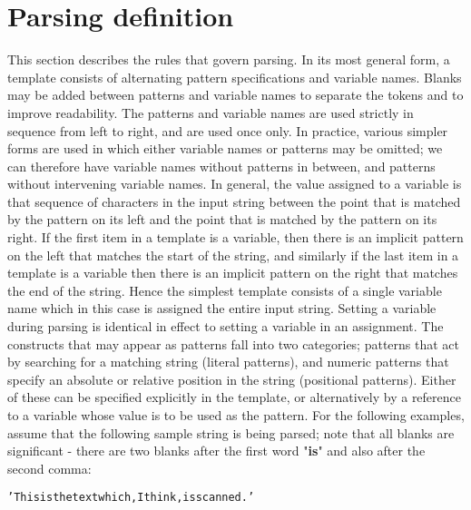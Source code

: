 \section{Parsing definition}\label{}
 This section describes the rules that govern parsing.
 In its most general form, a template consists of alternating pattern
specifications and variable names.  Blanks may be added between
patterns and variable names to separate the tokens and to improve
readability.  The patterns and variable names are used strictly in
sequence from left to right, and are used once only.  In practice,
various simpler forms are used in which either variable names or
patterns may be omitted; we can therefore have variable names without
patterns in between, and patterns without intervening variable names.
 In general, the value assigned to a variable is that sequence of
characters in the input string between the point that is matched by the
pattern on its left and the point that is matched by the pattern on its
right.
 If the first item in a template is a variable, then there is an
implicit pattern on the left that matches the start of the string, and
similarly if the last item in a template is a variable then there is an
implicit pattern on the right that matches the end of the string.
Hence the simplest template consists of a single variable name which in
this case is assigned the entire input string.
 Setting a variable during parsing is identical in effect to setting a
variable in an assignment.
 The constructs that may appear as patterns fall into two categories;
patterns that act by searching for a matching string (literal
patterns), and numeric patterns that specify an absolute or relative
position in the string (positional patterns).
Either of these can be specified explicitly in the template, or
alternatively by a reference to a variable whose value is to be used
as the pattern.
 For the following examples, assume that the following sample string
is being parsed; note that all blanks are significant - there are
two blanks after the first word "\textbf{is}" and also after the
second comma:
\begin{alltt}
'This is  the text which, I think,  is scanned.'
\end{alltt}
